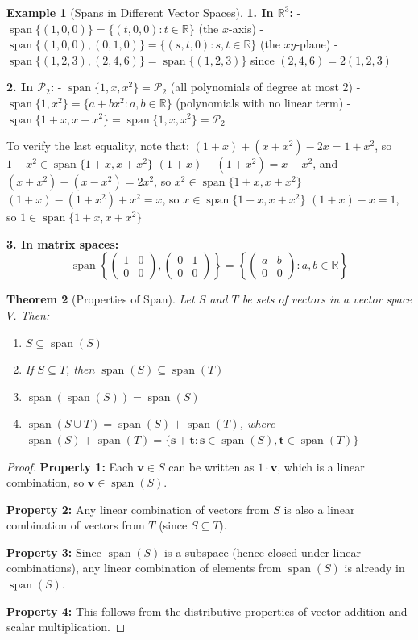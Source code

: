 \documentclass[12pt]{article}
\numberwithin{equation}{section}
\newcommand{\vect}[1]{\boldsymbol{#1}}   %
\newcommand{\Span}{\operatorname{span}}
\theoremstyle{plain}
\newtheorem{theorem}{Theorem}[section]
\theoremstyle{definition}
\newtheorem{example}[theorem]{Example}
\theoremstyle{remark}
\begin{document}
\begin{example}[Spans in Different Vector Spaces]
\textbf{1. In $\mathbb{R}^3$:}
- $\Span\{(1,0,0)\} = \{(t,0,0) : t \in \mathbb{R}\}$ (the $x$-axis)
- $\Span\{(1,0,0), (0,1,0)\} = \{(s,t,0) : s,t \in \mathbb{R}\}$ (the $xy$-plane)
- $\Span\{(1,2,3), (2,4,6)\} = \Span\{(1,2,3)\}$ since $(2,4,6) = 2(1,2,3)$

\textbf{2. In $\mathcal{P}_2$:}
- $\Span\{1, x, x^2\} = \mathcal{P}_2$ (all polynomials of degree at most 2)
- $\Span\{1, x^2\} = \{a + bx^2 : a,b \in \mathbb{R}\}$ (polynomials with no linear term)
- $\Span\{1 + x, x + x^2\} = \Span\{1, x, x^2\} = \mathcal{P}_2$

To verify the last equality, note that:
$(1 + x) + (x + x^2) - 2x = 1 + x^2$, so $1 + x^2 \in \Span\{1 + x, x + x^2\}$
$(1 + x) - (1 + x^2) = x - x^2$, and $(x + x^2) - (x - x^2) = 2x^2$, so $x^2 \in \Span\{1 + x, x + x^2\}$
$(1 + x) - (1 + x^2) + x^2 = x$, so $x \in \Span\{1 + x, x + x^2\}$
$(1 + x) - x = 1$, so $1 \in \Span\{1 + x, x + x^2\}$

\textbf{3. In matrix spaces:}
$$\Span\left\{\begin{pmatrix} 1 & 0 \\ 0 & 0 \end{pmatrix}, \begin{pmatrix} 0 & 1 \\ 0 & 0 \end{pmatrix}\right\} = \left\{\begin{pmatrix} a & b \\ 0 & 0 \end{pmatrix} : a,b \in \mathbb{R}\right\}$$
\end{example}

\begin{theorem}[Properties of Span]
Let $S$ and $T$ be sets of vectors in a vector space $V$. Then:
\begin{enumerate}
\item $S \subseteq \Span(S)$
\item If $S \subseteq T$, then $\Span(S) \subseteq \Span(T)$
\item $\Span(\Span(S)) = \Span(S)$
\item $\Span(S \cup T) = \Span(S) + \Span(T)$, where $\Span(S) + \Span(T) = \{\vect{s} + \vect{t} : \vect{s} \in \Span(S), \vect{t} \in \Span(T)\}$
\end{enumerate}
\end{theorem}

\begin{proof}
\textbf{Property 1:} Each $\vect{v} \in S$ can be written as $1 \cdot \vect{v}$, which is a linear combination, so $\vect{v} \in \Span(S)$.

\textbf{Property 2:} Any linear combination of vectors from $S$ is also a linear combination of vectors from $T$ (since $S \subseteq T$).

\textbf{Property 3:} Since $\Span(S)$ is a subspace (hence closed under linear combinations), any linear combination of elements from $\Span(S)$ is already in $\Span(S)$.

\textbf{Property 4:} This follows from the distributive properties of vector addition and scalar multiplication.
\end{proof}
\end{document}
